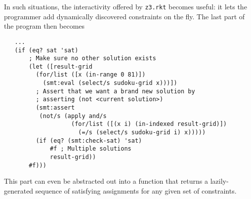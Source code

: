 In such situations, the interactivity offered by \texttt{z3.rkt} becomes
useful: it lets the programmer add dynamically discovered constraints on the
fly. The last part of the program then becomes

\begin{verbatim}
   ...
   (if (eq? sat 'sat)
       ; Make sure no other solution exists
       (let ([result-grid
         (for/list ([x (in-range 0 81)])
           (smt:eval (select/s sudoku-grid x)))])
         ; Assert that we want a brand new solution by
         ; asserting (not <current solution>)
         (smt:assert
          (not/s (apply and/s
                   (for/list ([(x i) (in-indexed result-grid)])
                     (=/s (select/s sudoku-grid i) x)))))
         (if (eq? (smt:check-sat) 'sat)
             #f ; Multiple solutions
             result-grid))
       #f)))
\end{verbatim}

This part can even be abstracted out into a function that returns a lazily-
generated sequence of satisfying assignments for any given set of constraints.
